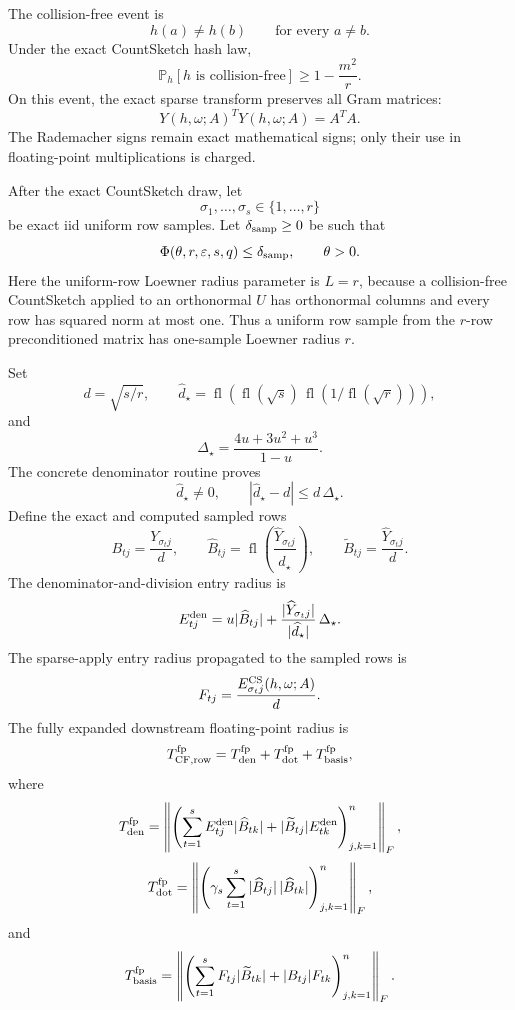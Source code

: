 \documentclass[11pt]{article}
\newcommand{\Prob}{\mathbb{P}}
\newcommand{\Frob}[1]{\left\lVert #1\right\rVert_F}
\newcommand{\fl}{\operatorname{fl}}
\newcommand{\eps}{\varepsilon}
\theoremstyle{remark}
\begin{document}
The collision-free event is
\[
  h(a)\ne h(b)\qquad\text{for every }a\ne b.
\]
Under the exact CountSketch hash law,
\[
  \Prob_h[h\text{ is collision-free}]\ge 1-\frac{m^2}{r}.
\]
On this event, the exact sparse transform preserves all Gram matrices:
\[
  Y(h,\omega;A)^TY(h,\omega;A)=A^TA .
\]
The Rademacher signs remain exact mathematical signs; only their use in
floating-point multiplications is charged.

After the exact CountSketch draw, let
\[
  \sigma_1,\ldots,\sigma_s\in\{1,\ldots,r\}
\]
be exact iid uniform row samples.  Let \(\delta_{\rm samp}\ge0\) be such that
\[
  \Phi(\theta,r,\eps,s,q)\le\delta_{\rm samp},
  \qquad \theta>0.
\]
Here the uniform-row Loewner radius parameter is \(L=r\), because a
collision-free CountSketch applied to an orthonormal \(U\) has orthonormal
columns and every row has squared norm at most one.  Thus a uniform row sample
from the \(r\)-row preconditioned matrix has one-sample Loewner radius \(r\).

Set
\[
  d=\sqrt{s/r},\qquad
  \widehat d_\star=
  \fl\!\left(\fl(\sqrt{s})\,\fl(1/\fl(\sqrt r))\right),
\]
and
\[
  \Delta_\star=\frac{4u+3u^2+u^3}{1-u}.
\]
The concrete denominator routine proves
\[
  \widehat d_\star\ne0,\qquad
  |\widehat d_\star-d|\le d\,\Delta_\star .
\]
Define the exact and computed sampled rows
\[
  B_{tj}=\frac{Y_{\sigma_tj}}{d},\qquad
  \widehat B_{tj}=\fl\!\left(
    \frac{\widehat Y_{\sigma_tj}}{\widehat d_\star}\right),
  \qquad
  \widetilde B_{tj}=\frac{\widehat Y_{\sigma_tj}}{d}.
\]
The denominator-and-division entry radius is
\[
  E^{\rm den}_{tj}
  =
  u|\widehat B_{tj}|
  +
  \frac{|\widehat Y_{\sigma_tj}|}{|\widehat d_\star|}\,\Delta_\star .
\]
The sparse-apply entry radius propagated to the sampled rows is
\[
  F_{tj}
  =
  \frac{E^{\rm CS}_{\sigma_tj}(h,\omega;A)}{d}.
\]
The fully expanded downstream floating-point radius is
\[
  T_{\rm CF,row}^{\rm fp}
  =
  T_{\rm den}^{\rm fp}
  +
  T_{\rm dot}^{\rm fp}
  +
  T_{\rm basis}^{\rm fp},
\]
where
\[
  T_{\rm den}^{\rm fp}
  =
  \Frob{
    \left(
      \sum_{t=1}^{s}
      E^{\rm den}_{tj}|\widehat B_{tk}|
      +
      |\widetilde B_{tj}|E^{\rm den}_{tk}
    \right)_{j,k=1}^{n}},
\]
\[
  T_{\rm dot}^{\rm fp}
  =
  \Frob{
    \left(
      \gamma_s\sum_{t=1}^{s}
      |\widehat B_{tj}|\,|\widehat B_{tk}|
    \right)_{j,k=1}^{n}},
\]
and
\[
  T_{\rm basis}^{\rm fp}
  =
  \Frob{
    \left(
      \sum_{t=1}^{s}
      F_{tj}|\widetilde B_{tk}|+|B_{tj}|F_{tk}
    \right)_{j,k=1}^{n}} .
\]
\end{document}
